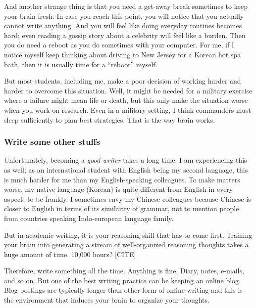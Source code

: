 \documentclass[11pt]{article}
\begin{document}
And another strange thing is that you need a get-away break sometimes to keep
your brain fresh. In case you reach this point, you will notice that you
actually cannot write anything. And you will feel like doing everyday routines
becomes hard; even reading a gossip story about a celebrity will feel like a
burden. Then you do need a reboot as you do sometimes with your computer.  For
me, if I notice myself keep thinking about driving to New Jersey for a Korean
hot spa bath, then it is usually time for a ``reboot'' myself. 

But most students, including me, make a poor decision of working harder and
harder to overcome this situation. Well, it might be needed for a military
exercise where a failure might mean life or death, but this only make the
situation worse when you work on research. Even in a military setting, I think
commanders must sleep sufficiently to plan best strategies. That is the way
brain works. 


\subsubsection{Write some other stuffs}


Unfortunately, becoming a \emph{good writer} takes a long time. I am
experiencing this as well; as an international student with English being my
second language, this is much harder for me than my English-speaking
colleagues.  To make matters worse, my native language (Korean) is quite
different from English in every aspect; to be frankly, I sometimes envy my
Chinese colleagues because Chinese is closer to English in terms of its
similarity of grammar, not to mention people from countries speaking
Indo-european language family.

But in academic writing, it is your reasoning skill that has to come first.
Training your brain into generating a stream of well-organized reasoning
thoughts takes a huge amount of time. 10,000 hours? [CITE]

Therefore, write something all the time. Anything is fine. Diary, notes,
e-mails, and so on. But one of the best writing practice can be keeping an
online blog. Blog postings are typically longer than other form of online
writing and this is the environment that induces your brain to organize your
thoughts. 
\end{document}
